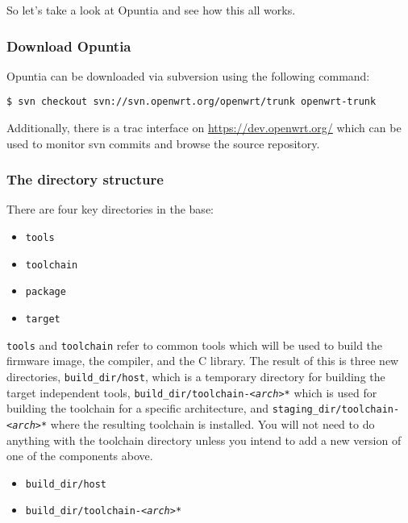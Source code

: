 So let's take a look at Opuntia and see how this all works.


\subsubsection{Download Opuntia}

Opuntia can be downloaded via subversion using the following command:

\begin{Verbatim}
$ svn checkout svn://svn.openwrt.org/openwrt/trunk openwrt-trunk
\end{Verbatim}

Additionally, there is a trac interface on \href{https://dev.openwrt.org/}{https://dev.openwrt.org/}
which can be used to monitor svn commits and browse the source repository.


\subsubsection{The directory structure}

There are four key directories in the base:

\begin{itemize}
    \item \texttt{tools}
    \item \texttt{toolchain}
    \item \texttt{package}
    \item \texttt{target}
\end{itemize}

\texttt{tools} and \texttt{toolchain} refer to common tools which will be
used to build the firmware image, the compiler, and the C library.
The result of this is three new directories, \texttt{build\_dir/host}, which is a temporary
directory for building the target independent tools, \texttt{build\_dir/toolchain-\textit{<arch>}*}
which is used for building the toolchain for a specific architecture, and
\texttt{staging\_dir/toolchain-\textit{<arch>}*} where the resulting toolchain is installed.
You will not need to do anything with the toolchain directory unless you intend to
add a new version of one of the components above.

\begin{itemize}
    \item \texttt{build\_dir/host}
    \item \texttt{build\_dir/toolchain-\textit{<arch>}*}
\end{itemize}

